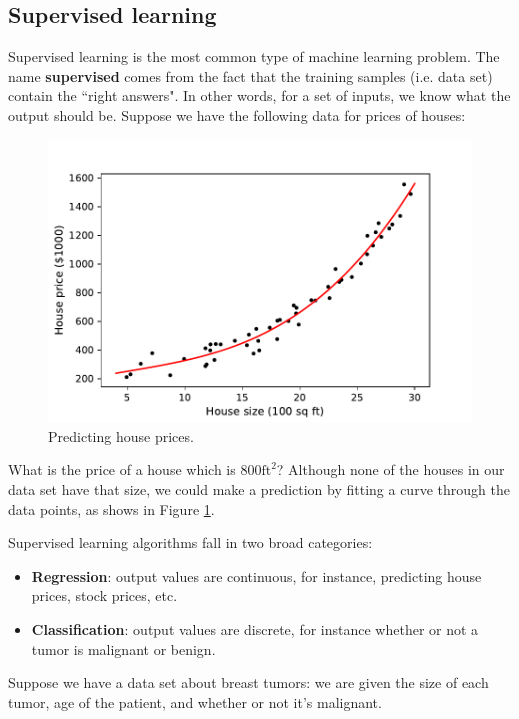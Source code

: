 \documentclass{article}
\theoremstyle{definition}
\begin{document}
\subsection{Supervised learning}
Supervised learning is the most common type of machine learning problem. The name \textbf{supervised} comes from the fact that the training samples (i.e. data set) contain the ``right answers". In other words, for a set of inputs, we know what the output should be. Suppose we have the following data for prices of houses:

\begin{figure}[ht]
\centering
\includegraphics[scale=0.7]{images/lin_reg/poly-data.pdf}
\caption{Predicting house prices.}
\label{into-house-prices}
\end{figure}

What is the price of a house which is $800 \text{ft}^2$? Although none of the houses in our data set have that size, we could make a prediction by fitting a curve through the data points, as shows in Figure \ref{into-house-prices}.

Supervised learning algorithms fall in two broad categories:
\begin{itemize}
    \item \textbf{Regression}: output values are continuous, for instance, predicting house prices, stock prices, etc.
    \item \textbf{Classification}: output values are discrete, for instance whether or not a tumor is malignant or benign.
\end{itemize}

Suppose we have a data set about breast tumors: we are given the size of each tumor, age of the patient, and whether or not it's malignant.
\end{document}

